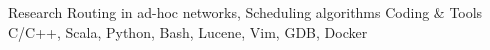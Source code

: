 
\begin{cvskills}

  \cvskill
    {Research} %
    {Routing in ad-hoc networks, Scheduling algorithms} %
  \cvskill
    {Coding \& Tools} %
    {C/C++, Scala, Python, Bash, Lucene, Vim, GDB, Docker} %



\end{cvskills}
